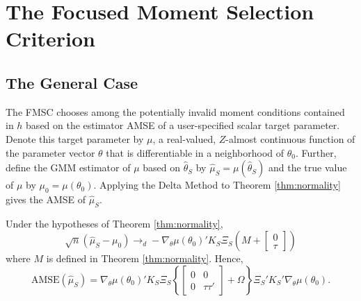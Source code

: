 \section{The Focused Moment Selection Criterion}
\label{sec:FMSC}

\subsection{The General Case}
The FMSC chooses among the potentially invalid moment conditions contained in $h$ based on the estimator AMSE of a user-specified scalar target parameter.
Denote this target parameter by $\mu$, a real-valued, $Z$-almost continuous function of the parameter vector $\theta$ that is differentiable in a neighborhood of $\theta_0$. 
Further, define the GMM estimator of $\mu$ based on $\widehat{\theta}_S$ by $\widehat{\mu}_S = \mu(\widehat{\theta}_S)$ and the true value of $\mu$ by $\mu_0 = \mu(\theta_0)$. 
Applying the Delta Method to Theorem \ref{thm:normality} gives the AMSE of $\widehat{\mu}_S$.

\begin{cor}
\label{cor:target}
Under the hypotheses of Theorem \ref{thm:normality}, 
$$\sqrt{n}\left(\widehat{\mu}_S - \mu_0\right)\rightarrow_d-\nabla_\theta\mu(\theta_0)'K_S \Xi_S \left(M +  \left[\begin{array}
	{c} 0 \\ \tau
\end{array} \right]\right)$$ 
where $M$ is defined in Theorem \ref{thm:normality}.
Hence,
	$$\mbox{AMSE}\left(\widehat{\mu}_S\right) = \nabla_\theta\mu(\theta_0)'K_S \Xi_S \left\{\left[\begin{array}{cc}0&0\\0&\tau\tau'\end{array}\right] + \Omega\right\}\Xi_S'K_S'\nabla_\theta\mu(\theta_0).$$
\end{cor}

